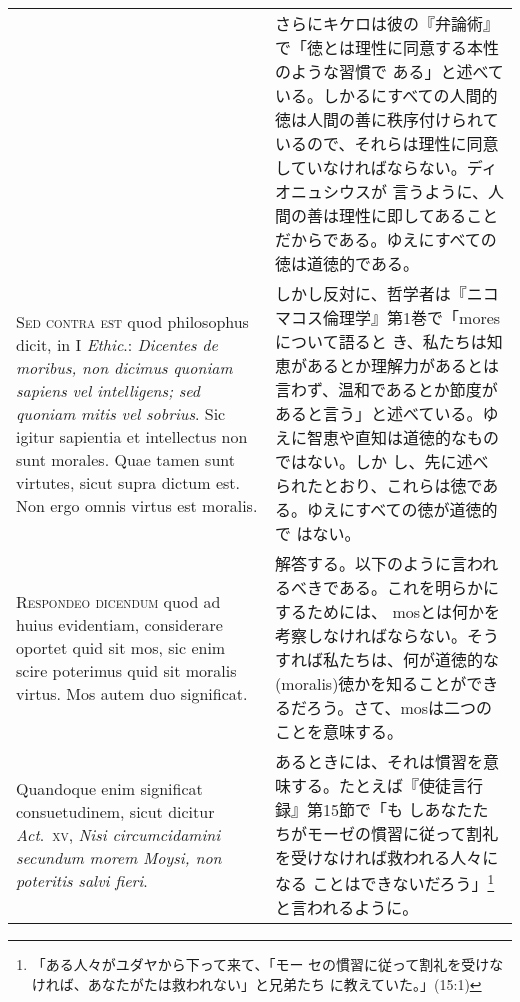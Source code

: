 \documentclass[10pt]{jsarticle}
\begin{document}
\begin{longtable}{p{21em}p{21em}}
&

さらにキケロは彼の『弁論術』で「徳とは理性に同意する本性のような習慣で
ある」と述べている。しかるにすべての人間的徳は人間の善に秩序付けられて
いるので、それらは理性に同意していなければならない。ディオニュシウスが
言うように、人間の善は理性に即してあることだからである。ゆえにすべての
徳は道徳的である。

\\



{\scshape Sed contra est} quod philosophus dicit, in I {\itshape
Ethic}.: {\itshape Dicentes de moribus, non dicimus quoniam sapiens
vel intelligens; sed quoniam mitis vel sobrius}. Sic igitur sapientia
et intellectus non sunt morales. Quae tamen sunt virtutes, sicut supra
dictum est. Non ergo omnis virtus est moralis.

&

しかし反対に、哲学者は『ニコマコス倫理学』第1巻で「moresについて語ると
き、私たちは知恵があるとか理解力があるとは言わず、温和であるとか節度が
あると言う」と述べている。ゆえに智恵や直知は道徳的なものではない。しか
し、先に述べられたとおり、これらは徳である。ゆえにすべての徳が道徳的で
はない。

\\


{\scshape Respondeo dicendum} quod ad huius evidentiam, considerare
oportet quid sit mos, sic enim scire poterimus quid sit moralis
virtus. Mos autem duo significat.

&

解答する。以下のように言われるべきである。これを明らかにするためには、
mosとは何かを考察しなければならない。そうすれば私たちは、何が道徳的な
(moralis)徳かを知ることができるだろう。さて、mosは二つのことを意味する。

\\



Quandoque enim significat consuetudinem, sicut dicitur {\itshape
Act}.~{\scshape xv}, {\itshape Nisi circumcidamini secundum morem
Moysi, non poteritis salvi fieri}.

&

あるときには、それは慣習を意味する。たとえば『使徒言行録』第15節で「も
しあなたたちがモーゼの慣習に従って割礼を受けなければ救われる人々になる
ことはできないだろう」\footnote{「ある人々がユダヤから下って来て、「モー
セの慣習に従って割礼を受けなければ、あなたがたは救われない」と兄弟たち
に教えていた。」(15:1)}と言われるように。


\\




\end{longtable}
\end{document}
